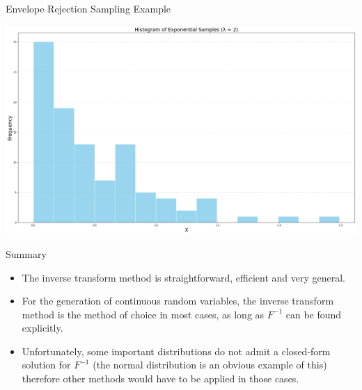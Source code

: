 \documentclass[8pt]{beamer}
\begin{document}
\begin{frame}[fragile]{Envelope Rejection Sampling Example}
\begin{center}
\includegraphics[width=\textwidth]{chapter1-part2-plot1.png}
\end{center}
\end{frame}


\begin{frame}{Summary}
\begin{itemize}
	\item The inverse transform method is straightforward, efficient and very general.
	\item For the generation of continuous random variables, the inverse transform method is the method of choice in most cases, as long as $F^{-1}$ can be found explicitly.
	\item Unfortunately, some important distributions do not admit a closed-form solution for $F^{-1}$ (the normal distribution is an obvious example of this) therefore other methods would have to be applied in those cases.

\end{itemize}
\end{frame}
\end{document}
